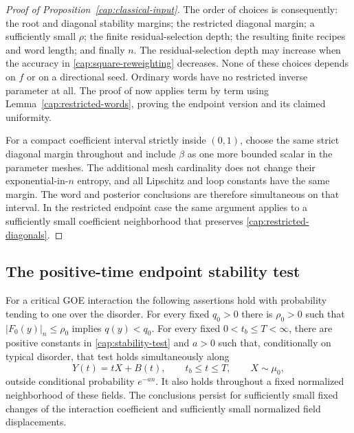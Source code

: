 \begin{proof}[Proof of Proposition~\ref{cap:classical-input}]
The order of choices is consequently: the root and diagonal stability margins;
the restricted diagonal margin; a sufficiently small $\rho$; the finite
residual-selection depth; the resulting finite recipes and word length; and
finally $n$. The residual-selection depth may increase when the accuracy in
\eqref{cap:square-reweighting} decreases. None of these choices depends on $f$
or on a directional seed. Ordinary words have no restricted inverse parameter
at all. The proof of \cite[Section~6 and Propositions~7.2--7.3]{AcceptedGap}
now applies term by term using Lemma~\ref{cap:restricted-words}, proving the
endpoint version and its claimed uniformity.

For a compact coefficient interval strictly inside $(0,1)$, choose the same
strict diagonal margin throughout and include $\beta$ as one more bounded
scalar in the parameter meshes. The additional mesh cardinality does not
change their exponential-in-$n$ entropy, and all Lipschitz and loop constants
have the same margin. The word and posterior conclusions are therefore
simultaneous on that interval. In the restricted endpoint case the same
argument applies to a sufficiently small coefficient neighborhood that
preserves \eqref{cap:restricted-diagonals}. \end{proof}

\subsection{The positive-time endpoint stability test}

\begin{lemma}\label{cap:endpoint-stability}
For a critical GOE interaction the following assertions hold with
probability tending to one over the disorder.
For every fixed $q_0>0$ there is $\rho_0>0$ such that
$|F_0(y)|_n\le\rho_0$ implies $q(y)<q_0$.
For every fixed $0<t_b\le T<\infty$, there are positive constants in
\eqref{cap:stability-test} and $a>0$ such that, conditionally on typical
disorder, that test holds simultaneously along
\[
 Y(t)=tX+B(t),\qquad t_b\le t\le T,
 \qquad X\sim\mu_0,
\]
outside conditional probability $e^{-an}$.  It also holds throughout a
fixed normalized neighborhood of these fields.  The conclusions persist
for sufficiently small fixed changes of the interaction coefficient and
sufficiently small normalized field displacements.
\end{lemma}

